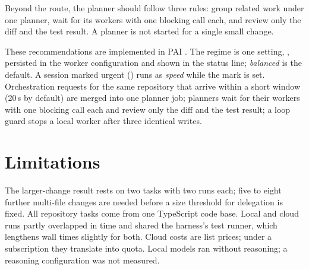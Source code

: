 Beyond the route, the planner should follow three rules: group related work under one planner, wait for its
workers with one blocking call each, and review only the diff and the test result. A planner is not started for a
single small change.

These recommendations are implemented in PAI \citep{Nott-2026aa}. The regime is one setting,
, persisted in the worker configuration and shown in the status line;
\emph{balanced} is the default. A session marked urgent () runs as \emph{speed} while the mark is
set. Orchestration requests for the same repository that arrive within a short window (20\,s by default) are
merged into one planner job; planners wait for their workers with one blocking call each and review only the diff
and the test result; a loop guard stops a local worker after three identical writes.

\section{Limitations}\label{sec:limitations}

The larger-change result rests on two tasks with two runs each; five to eight further multi-file changes are
needed before a size threshold for delegation is fixed. All repository tasks come from one TypeScript code base.
Local and cloud runs partly overlapped in time and shared the harness's test runner, which lengthens wall times
slightly for both. Cloud costs are list prices; under a subscription they translate into quota. Local models ran
without reasoning; a reasoning configuration was not measured.

\clearpage
{}
{}
\printbibliography[title={References}]


